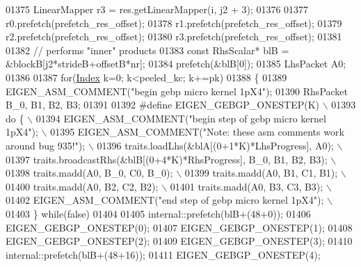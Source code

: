 \begin{DoxyCode}
01375           LinearMapper r3 = res.getLinearMapper(i, j2 + 3);
01376 
01377           r0.prefetch(prefetch\_res\_offset);
01378           r1.prefetch(prefetch\_res\_offset);
01379           r2.prefetch(prefetch\_res\_offset);
01380           r3.prefetch(prefetch\_res\_offset);
01381 
01382           \textcolor{comment}{// performs "inner" products}
01383           \textcolor{keyword}{const} RhsScalar* blB = &blockB[j2*strideB+offsetB*nr];
01384           prefetch(&blB[0]);
01385           LhsPacket A0;
01386 
01387           \textcolor{keywordflow}{for}(\hyperlink{namespace_eigen_a62e77e0933482dafde8fe197d9a2cfde}{Index} k=0; k<peeled\_kc; k+=pk)
01388           \{
01389             EIGEN\_ASM\_COMMENT(\textcolor{stringliteral}{"begin gebp micro kernel 1pX4"});
01390             RhsPacket B\_0, B1, B2, B3;
01391                
01392 \textcolor{preprocessor}{#define EIGEN\_GEBGP\_ONESTEP(K) \(\backslash\)}
01393 \textcolor{preprocessor}{            do \{                                                                \(\backslash\)}
01394 \textcolor{preprocessor}{              EIGEN\_ASM\_COMMENT("begin step of gebp micro kernel 1pX4");        \(\backslash\)}
01395 \textcolor{preprocessor}{              EIGEN\_ASM\_COMMENT("Note: these asm comments work around bug 935!"); \(\backslash\)}
01396 \textcolor{preprocessor}{              traits.loadLhs(&blA[(0+1*K)*LhsProgress], A0);                    \(\backslash\)}
01397 \textcolor{preprocessor}{              traits.broadcastRhs(&blB[(0+4*K)*RhsProgress], B\_0, B1, B2, B3);  \(\backslash\)}
01398 \textcolor{preprocessor}{              traits.madd(A0, B\_0, C0, B\_0);                                    \(\backslash\)}
01399 \textcolor{preprocessor}{              traits.madd(A0, B1,  C1, B1);                                     \(\backslash\)}
01400 \textcolor{preprocessor}{              traits.madd(A0, B2,  C2, B2);                                     \(\backslash\)}
01401 \textcolor{preprocessor}{              traits.madd(A0, B3,  C3, B3);                                     \(\backslash\)}
01402 \textcolor{preprocessor}{              EIGEN\_ASM\_COMMENT("end step of gebp micro kernel 1pX4");          \(\backslash\)}
01403 \textcolor{preprocessor}{            \} while(false)}
01404             
01405             internal::prefetch(blB+(48+0));
01406             EIGEN\_GEBGP\_ONESTEP(0);
01407             EIGEN\_GEBGP\_ONESTEP(1);
01408             EIGEN\_GEBGP\_ONESTEP(2);
01409             EIGEN\_GEBGP\_ONESTEP(3);
01410             internal::prefetch(blB+(48+16));
01411             EIGEN\_GEBGP\_ONESTEP(4);

\end{DoxyCode}
